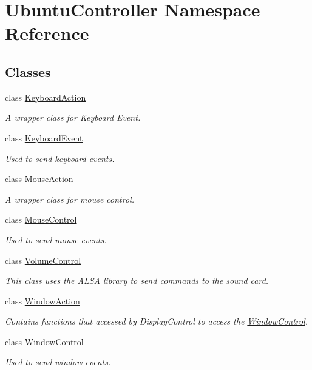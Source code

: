 \hypertarget{namespaceUbuntuController}{}\section{Ubuntu\+Controller Namespace Reference}
\label{namespaceUbuntuController}
\subsection*{Classes}
\begin{DoxyCompactItemize}
\item 
class \hyperlink{classUbuntuController_1_1KeyboardAction}{Keyboard\+Action}
\begin{DoxyCompactList}\small\item\em A wrapper class for Keyboard Event. \end{DoxyCompactList}\item 
class \hyperlink{classUbuntuController_1_1KeyboardEvent}{Keyboard\+Event}
\begin{DoxyCompactList}\small\item\em Used to send keyboard events. \end{DoxyCompactList}\item 
class \hyperlink{classUbuntuController_1_1MouseAction}{Mouse\+Action}
\begin{DoxyCompactList}\small\item\em A wrapper class for mouse control. \end{DoxyCompactList}\item 
class \hyperlink{classUbuntuController_1_1MouseControl}{Mouse\+Control}
\begin{DoxyCompactList}\small\item\em Used to send mouse events. \end{DoxyCompactList}\item 
class \hyperlink{classUbuntuController_1_1VolumeControl}{Volume\+Control}
\begin{DoxyCompactList}\small\item\em This class uses the A\+L\+SA library to send commands to the sound card. \end{DoxyCompactList}\item 
class \hyperlink{classUbuntuController_1_1WindowAction}{Window\+Action}
\begin{DoxyCompactList}\small\item\em Contains functions that accessed by Display\+Control to access the \hyperlink{classUbuntuController_1_1WindowControl}{Window\+Control}. \end{DoxyCompactList}\item 
class \hyperlink{classUbuntuController_1_1WindowControl}{Window\+Control}
\begin{DoxyCompactList}\small\item\em Used to send window events. \end{DoxyCompactList}\end{DoxyCompactItemize}
